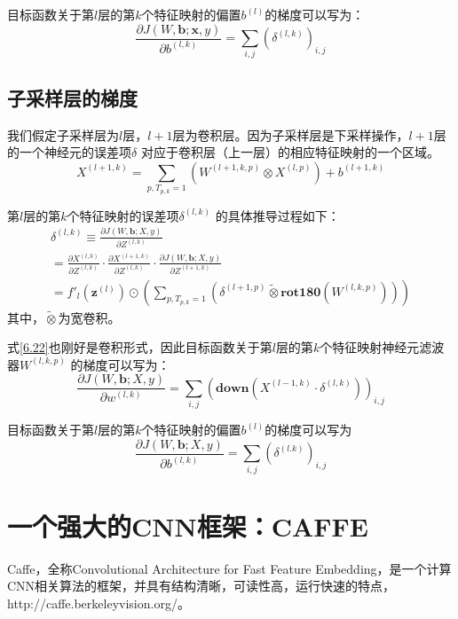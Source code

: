 \documentclass[11pt,fleqn, UTF8]{ctexbook} %
\begin{document}
目标函数关于第$l$层的第$k$个特征映射的偏置$b^{(l)}$的梯度可以写为：
\begin{equation}\label{6.25}
  \frac{\partial J(W,\boldsymbol{b};\boldsymbol{x},y)}{\partial b^{(l,k)}}=\sum_{i,j}(\delta^{(l,k)})_{i,j}
\end{equation}
\subsection{子采样层的梯度}
我们假定子采样层为$l$层，$l+1$层为卷积层。因为子采样层是下采样操作，$l+1$层的一个神经元的误差项$\delta$ 对应于卷积层（上一层）的相应特征映射的一个区域。
\begin{equation}\label{6.26}
  X^{(l+1,k)}=\sum_{p,T_{p,k}=1}(W^{(l+1,k,p)}\otimes X^{(l,p)})+b^{(l+1,k)}
\end{equation}

第$l$层的第$k$个特征映射的误差项$\delta^{(l,k)}$ 的具体推导过程如下：
\begin{gather}\label{6.27}
  \delta^{(l,k)} \equiv \frac{\partial J(W,\boldsymbol{b};X,y)}{\partial Z^{(l,k)}}\\
  =\frac{\partial X^{(l,k)}}{\partial Z^{(l,k)}}\cdot \frac{\partial X^{(l+1,k)}}{\partial Z^{(l,k)}}\cdot\frac{\partial J(W,\boldsymbol{b};X,y)}{\partial Z^{(l+1,k)}}\\
  =f'_l(\boldsymbol{z}^{(l)})\odot\left( \sum_{p,T_{p,k}=1}(\delta^{(l+1,p)}\widetilde{\otimes}\boldsymbol{rot180}(W^{(l,k,p)})) \right)
\end{gather}
其中，$\widetilde{\otimes}$为宽卷积。

式\ref{6.22}也刚好是卷积形式，因此目标函数关于第$l$层的第$k$个特征映射神经元滤波器$W^{(l,k,p)}$ 的梯度可以写为：
\begin{equation}\label{6.30}
  \frac{\partial J(W,\boldsymbol{b};X,y)}{\partial w^{(l,k)}}=\sum_{i,j}\left( \boldsymbol{down}(X^{(l-1,k)}\cdot \delta^{(l,k)}) \right)_{i,j}
\end{equation}

目标函数关于第$l$层的第$k$个特征映射的偏置$b^{(l)}$的梯度可以写为
\begin{equation}\label{6.31}
  \frac{\partial J(W,\boldsymbol{b};X,y)}{\partial b^{(l,k)}}=\sum_{i,j}(\delta^{(l.k)})_{i,j}
\end{equation}
\section{一个强大的CNN框架：CAFFE}
Caffe，全称Convolutional Architecture for Fast Feature Embedding，是一个计算CNN相关算法的框架，并具有结构清晰，可读性高，运行快速的特点，http://caffe.berkeleyvision.org/。
\end{document}
